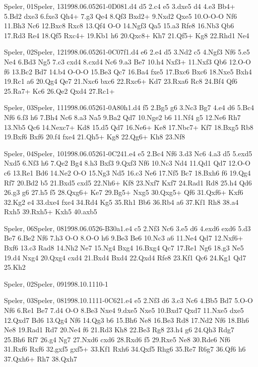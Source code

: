 \documentclass[twocolumn,a4paper,10pt]{report}
\begin{document}
\begin{chessgame}{Speler, 01}{Speler, 13}{1998.06.05}{26}{1-0}{D08}{1.d4 d5 2.c4 e5 3.dxe5 d4 4.e3 Bb4+ 5.Bd2 dxe3 6.fxe3 Qh4+ 7.g3 Qe4 8.Qf3 Bxd2+ 9.Nxd2 Qxe5 10.O-O-O Nf6 11.Bh3 Nc6 12.Bxc8 Rxc8 13.Qf4 O-O 14.Ngf3 Qa5 15.a3 Rfe8 16.Nb3 Qb6 17.Rd3 Re4 18.Qf5 Rxc4+ 19.Kb1 h6 20.Qxc8+ Kh7 21.Qf5+ Kg8 22.Rhd1 Ne4}\end{chessgame}
\begin{chessgame}{Speler, 02}{Speler, 12}{1998.06.05}{26}{1-0}{C07f}{1.d4 e6 2.e4 d5 3.Nd2 c5 4.Ngf3 Nf6 5.e5 Ne4 6.Bd3 Ng5 7.c3 cxd4 8.cxd4 Nc6 9.a3 Be7 10.h4 Nxf3+ 11.Nxf3 Qb6 12.O-O f6 13.Bc2 Bd7 14.b4 O-O-O 15.Be3 Qc7 16.Ba4 fxe5 17.Bxc6 Bxc6 18.Nxe5 Bxh4 19.Rc1 a6 20.Qg4 Qe7 21.Nxc6 bxc6 22.Rxc6+ Kd7 23.Rxa6 Rc8 24.Bf4 Qf6 25.Ra7+ Kc6 26.Qe2 Qxd4 27.Rc1+}\end{chessgame}
\begin{chessgame}{Speler, 03}{Speler, 11}{1998.06.05}{26}{1-0}{A80h}{1.d4 f5 2.Bg5 g6 3.Nc3 Bg7 4.e4 d6 5.Bc4 Nf6 6.f3 h6 7.Bh4 Nc6 8.a3 Na5 9.Ba2 Qd7 10.Nge2 b6 11.Nf4 g5 12.Ne6 Rh7 13.Nb5 Qc6 14.Nexc7+ Kd8 15.d5 Qd7 16.Ne6+ Ke8 17.Nbc7+ Kf7 18.Bxg5 Rb8 19.Bxf6 Bxf6 20.f4 fxe4 21.Qh5+ Kg8 22.Qg6+ Kh8 23.Nf8}\end{chessgame}
\begin{chessgame}{Speler, 04}{Speler, 10}{1998.06.05}{26}{1-0}{C24}{1.e4 e5 2.Bc4 Nf6 3.d3 Nc6 4.a3 d5 5.exd5 Nxd5 6.Nf3 h6 7.Qe2 Bg4 8.h3 Bxf3 9.Qxf3 Nf6 10.Nc3 Nd4 11.Qd1 Qd7 12.O-O c6 13.Re1 Bd6 14.Ne2 O-O 15.Ng3 Nd5 16.c3 Ne6 17.Nf5 Bc7 18.Bxh6 f6 19.Qg4 Rf7 20.Bd2 b5 21.Bxd5 cxd5 22.Nh6+ Kf8 23.Nxf7 Kxf7 24.Rad1 Rd8 25.h4 Qd6 26.g3 g6 27.h5 f5 28.Qxg6+ Ke7 29.Bg5+ Nxg5 30.Qxg5+ Qf6 31.Qxf6+ Kxf6 32.Kg2 e4 33.dxe4 fxe4 34.Rd4 Kg5 35.Rh1 Bb6 36.Rb4 a6 37.Kf1 Rh8 38.a4 Rxh5 39.Rxh5+ Kxh5 40.axb5}\end{chessgame}
\begin{chessgame}{Speler, 06}{Speler, 08}{1998.06.05}{26}{\textonehalf-\textonehalf}{B30a}{1.e4 c5 2.Nf3 Nc6 3.e5 d6 4.exd6 exd6 5.d3 Be7 6.Be2 Nf6 7.h3 O-O 8.O-O h6 9.Be3 Be6 10.Nc3 a6 11.Ne4 Qd7 12.Nxf6+ Bxf6 13.c3 Rad8 14.Nh2 Ne7 15.Ng4 Bxg4 16.Bxg4 Qc7 17.Re1 Ng6 18.g3 Ne5 19.d4 Nxg4 20.Qxg4 cxd4 21.Bxd4 Bxd4 22.Qxd4 Rfe8 23.Kf1 Qc6 24.Kg1 Qd7 25.Kh2}\end{chessgame}
\begin{chessempty}{Speler, 02}{Speler, 09}{1998.10.11}{1}{0-1}{}\end{chessempty}
\begin{chessgame}{Speler, 03}{Speler, 08}{1998.10.11}{1}{1-0}{C62}{1.e4 e5 2.Nf3 d6 3.c3 Nc6 4.Bb5 Bd7 5.O-O Nf6 6.Re1 Be7 7.d4 O-O 8.Be3 Nxe4 9.dxe5 Nxe5 10.Bxd7 Qxd7 11.Nxe5 dxe5 12.Qxd7 Bd6 13.Qg4 Nf6 14.Qg3 b6 15.Bh6 Ne8 16.Be3 Rd8 17.Nd2 Nf6 18.Bh6 Ne8 19.Rad1 Rd7 20.Ne4 f6 21.Rd3 Kh8 22.Be3 Rg8 23.h4 g6 24.Qh3 Rdg7 25.Bh6 Rf7 26.g4 Ng7 27.Nxd6 cxd6 28.Rxd6 f5 29.Rxe5 Ne8 30.Rde6 Nf6 31.Rxf6 Rxf6 32.gxf5 gxf5+ 33.Kf1 Rxh6 34.Qxf5 Rhg6 35.Re7 R6g7 36.Qf6 h6 37.Qxh6+ Rh7 38.Qxh7\mate}\end{chessgame}
\end{document}
